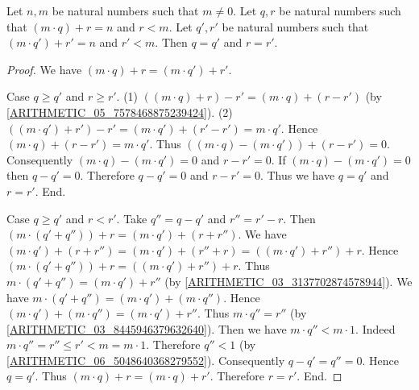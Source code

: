 \documentclass[10pt]{article}
\begin{document}
  \begin{forthel}
    \begin{proposition}
      Let $n, m$ be natural numbers such that $m \neq 0$.
      Let $q, r$ be natural numbers such that $(m \cdot q) + r = n$ and $r < m$.
      Let $q', r'$ be natural numbers such that $(m \cdot q') + r' = n$ and
      $r' < m$.
      Then $q = q'$ and $r = r'$.
    \end{proposition}
    \begin{proof}
      We have $(m \cdot q) + r = (m \cdot q') + r'$.

      Case $q \geq q'$ and $r \geq r'$.
        (1) $((m \cdot q) + r) - r' = (m \cdot q) + (r - r')$ (by \cref{ARITHMETIC_05_7578468875239424}).
        (2) $((m \cdot q') + r') - r'
          = (m \cdot q') + (r' - r')
          = m \cdot q'$.
        Hence $(m \cdot q) + (r - r') = m \cdot q'$.
        Thus $((m \cdot q) - (m \cdot q')) + (r - r') = 0$.
        Consequently $(m \cdot q) - (m \cdot q') = 0$ and $r - r' = 0$.
        If $(m \cdot q) - (m \cdot q') = 0$ then $q - q' = 0$.
        Therefore $q - q' = 0$ and $r - r' = 0$.
        Thus we have $q = q'$ and $r = r'$.
      End.

      Case $q \geq q'$ and $r < r'$.
        Take $q'' = q - q'$ and $r'' = r' - r$.
        Then $(m \cdot (q' + q'')) + r = (m \cdot q') + (r + r'')$.
        We have $(m \cdot q') + (r + r'')
          = (m \cdot q') + (r'' + r)
          = ((m \cdot q') + r'') + r$.
        Hence $(m \cdot (q' + q'')) + r = ((m \cdot q') + r'') + r$.
        Thus $m \cdot (q' + q'') = (m \cdot q') + r''$ (by \cref{ARITHMETIC_03_3137702874578944}).
        We have $m \cdot (q' + q'') = (m \cdot q') + (m \cdot q'')$.
        Hence $(m \cdot q') + (m \cdot q'') = (m \cdot q') + r''$.
        Thus $m \cdot q'' = r''$ (by \cref{ARITHMETIC_03_8445946379632640}).
        Then we have $m \cdot q'' < m \cdot 1$.
        Indeed $m \cdot q''
          = r''
          \leq r'
          < m
          = m \cdot 1$.
        Therefore $q'' < 1$ (by \cref{ARITHMETIC_06_5048640368279552}).
        Consequently $q - q' = q'' = 0$.
        Hence $q = q'$.
        Thus $(m \cdot q) + r = (m \cdot q) + r'$.
        Therefore $r = r'$.
      End.


\end{proof}
\end{forthel}
\end{document}
